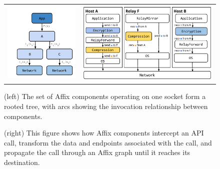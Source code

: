 \begin{figure}[htb]

  \centering
    \begin{tabular}{c c}  
    \includegraphics[width=0.35\linewidth]{figs/tree.pdf}  \hspace{.05cm} &
  \includegraphics[width=0.6\linewidth]{figs/propagation.pdf}    \\
  \end{tabular}
  \caption{(left) The set of Affix components operating on one
socket form a rooted tree, with arcs showing the 
invocation relationship between components.}
\label{fig-tree}
\caption{(right) This figure shows how Affix components 
  intercept an API call, transform the data and endpoints 
  associated with the call, and propagate the call through 
  an Affix graph until it reaches its destination.}
\label{fig-dataflow}

\end{figure}






